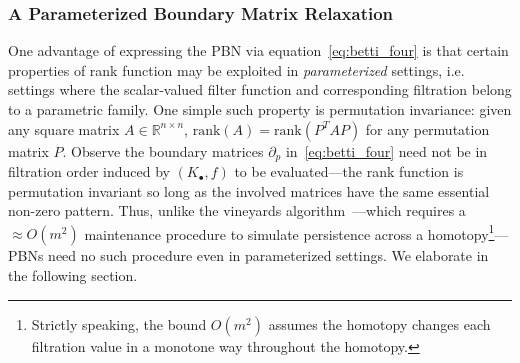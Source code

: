 \documentclass[10pt]{article}
\newcommand{\+}{%
	\raisebox{0.18ex}{\scaleobj{0.55}{+}}
}
\begin{document}
\subsubsection*{A Parameterized Boundary Matrix Relaxation}
One advantage of expressing the PBN via equation~\eqref{eq:betti_four} is that certain properties of rank function may be exploited in \emph{parameterized} settings, i.e. settings where the scalar-valued filter function and corresponding filtration belong to a parametric family.  
One simple such property is permutation invariance: given any square matrix $A \in \mathbb{R}^{n \times n}$, $\mathrm{rank}(A) = \mathrm{rank}(P^T A P)$ for any permutation matrix $P$. Observe the boundary matrices $\partial_p$ in~\eqref{eq:betti_four} need not be in filtration order induced by $(K_\bullet, f)$ to be evaluated---the rank function is permutation invariant so long as the involved matrices have the same essential non-zero pattern. 
Thus, unlike the vineyards algorithm~\cite{cohen2006vines}---which requires a $\approx O(m^2)$ maintenance procedure to simulate persistence across a homotopy\footnote{Strictly speaking, the bound $O(m^2)$ assumes the homotopy changes each filtration value in a monotone way throughout the homotopy. }---PBNs need no such procedure even in parameterized settings. 
We elaborate in the following section. 
\end{document}
